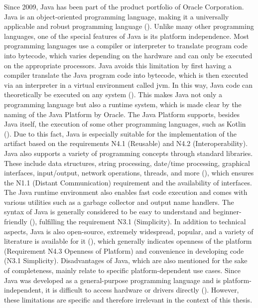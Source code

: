Since 2009, Java has been part of the product portfolio of Oracle Corporation. Java is an object-oriented programming language, making it a universally applicable and robust programming language (\cite{Ullenboom.2017}). Unlike many other programming languages, one of the special features of Java is its platform independence. Most programming languages use a compiler or interpreter to translate program code into bytecode, which varies depending on the hardware and can only be executed on the appropriate processors. Java avoids this limitation by first having a compiler translate the Java program code into bytecode, which is then executed via an interpreter in a virtual environment called \ac{jvm}. In this way, Java code can theoretically be executed on any system (\cite{Ullenboom.2017}). This makes Java not only a programming language but also a runtime system, which is made clear by the naming of the Java Platform by Oracle. The Java Platform supports, besides Java itself, the execution of some other programming languages, such as Kotlin (\cite{kotlinlang.2023}). Due to this fact, Java is especially suitable for the implementation of the artifact based on the requirements N4.1 (Reusable) and N4.2 (Interoperability). Java also supports a variety of programming concepts through standard libraries. These include data structures, string processing, date/time processing, graphical interfaces, input/output, network operations, threads, and more (\cite{Ullenboom.2017}), which ensures the N1.1 (Distant Communication) requirement and the availability of interfaces. The Java runtime environment also enables fast code execution and comes with various utilities such as a garbage collector and output name handlers. The syntax of Java is generally considered to be easy to understand and beginner-friendly (\cite{Ullenboom.2017}), fulfilling the requirement N3.1 (Simplicity). In addition to technical aspects, Java is also open-source, extremely widespread, popular, and a variety of literature is available for it (\cite{Ullenboom.2017}), which generally indicates openness of the platform (Requirement N4.3 Openness of Platform) and convenience in developing code (N3.1 Simplicity). Disadvantages of Java, which are also mentioned for the sake of completeness, mainly relate to specific platform-dependent use cases. Since Java was developed as a general-purpose programming language and is platform-independent, it is difficult to access hardware or drivers directly (\cite{Ullenboom.2017}). However, these limitations are specific and therefore irrelevant in the context of this thesis.  



